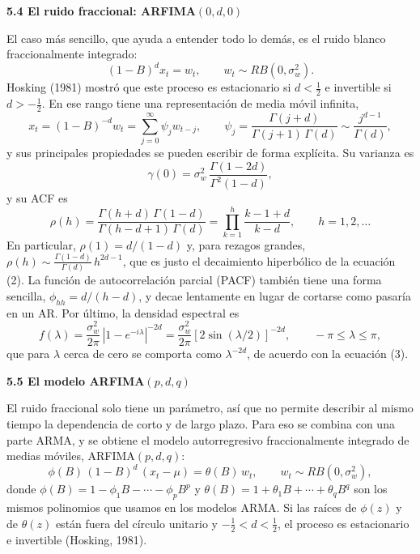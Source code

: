 \documentclass[legalpaper,11pt]{article}
\begin{document}
\begin{enumerate}
\medskip
\noindent\textbf{5.4 El ruido fraccional: ARFIMA$(0,d,0)$}

El caso m\'as sencillo, que ayuda a entender todo lo dem\'as, es el ruido blanco fraccionalmente integrado:
\begin{equation}
(1-B)^{d} x_t = w_t, \qquad w_t \sim RB(0, \sigma_w^{2}).
\end{equation}
Hosking (1981) mostr\'o que este proceso es estacionario si $d < \tfrac{1}{2}$ e invertible si $d > -\tfrac{1}{2}$. En ese rango tiene una representaci\'on de media m\'ovil infinita,
\begin{equation}
x_t = (1-B)^{-d} w_t = \sum_{j=0}^{\infty} \psi_j w_{t-j}, \qquad \psi_j = \frac{\Gamma(j+d)}{\Gamma(j+1)\,\Gamma(d)} \sim \frac{j^{d-1}}{\Gamma(d)},
\end{equation}
y sus principales propiedades se pueden escribir de forma expl\'icita. Su varianza es
\begin{equation}
\gamma(0) = \sigma_w^{2}\, \frac{\Gamma(1-2d)}{\Gamma^{2}(1-d)},
\end{equation}
y su ACF es
\begin{equation}
\rho(h) = \frac{\Gamma(h+d)\,\Gamma(1-d)}{\Gamma(h-d+1)\,\Gamma(d)} = \prod_{k=1}^{h} \frac{k-1+d}{k-d}, \qquad h = 1, 2, \ldots
\end{equation}
En particular, $\rho(1) = d/(1-d)$ y, para rezagos grandes, $\rho(h) \sim \frac{\Gamma(1-d)}{\Gamma(d)}\, h^{2d-1}$, que es justo el decaimiento hiperb\'olico de la ecuaci\'on (2). La funci\'on de autocorrelaci\'on parcial (PACF) tambi\'en tiene una forma sencilla, $\phi_{hh} = d/(h-d)$, y decae lentamente en lugar de cortarse como pasar\'ia en un AR. Por \'ultimo, la densidad espectral es
\begin{equation}
f(\lambda) = \frac{\sigma_w^{2}}{2\pi}\, \left| 1 - e^{-i\lambda} \right|^{-2d} = \frac{\sigma_w^{2}}{2\pi} \left[ 2\sin(\lambda/2) \right]^{-2d}, \qquad -\pi \le \lambda \le \pi,
\end{equation}
que para $\lambda$ cerca de cero se comporta como $\lambda^{-2d}$, de acuerdo con la ecuaci\'on (3).

\medskip
\noindent\textbf{5.5 El modelo ARFIMA$(p,d,q)$}

El ruido fraccional solo tiene un par\'ametro, as\'i que no permite describir al mismo tiempo la dependencia de corto y de largo plazo. Para eso se combina con una parte ARMA, y se obtiene el modelo autorregresivo fraccionalmente integrado de medias m\'oviles, ARFIMA$(p,d,q)$:
\begin{equation}
\phi(B)\,(1-B)^{d}\,(x_t - \mu) = \theta(B)\, w_t, \qquad w_t \sim RB(0, \sigma_w^{2}),
\end{equation}
donde $\phi(B) = 1 - \phi_1 B - \cdots - \phi_p B^{p}$ y $\theta(B) = 1 + \theta_1 B + \cdots + \theta_q B^{q}$ son los mismos polinomios que usamos en los modelos ARMA. Si las ra\'ices de $\phi(z)$ y de $\theta(z)$ est\'an fuera del c\'irculo unitario y $-\tfrac{1}{2} < d < \tfrac{1}{2}$, el proceso es estacionario e invertible (Hosking, 1981).


\end{enumerate}
\end{document}
